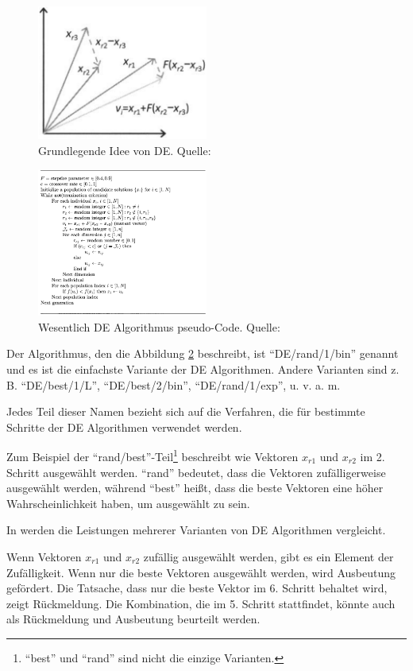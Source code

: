 \documentclass[twoside,twocolumn]{article}
\begin{document}
\begin{figure}[h]
\caption{Grundlegende Idee von DE. Quelle: \cite{wiley_evolutionary}}
\label{fig:de_beispiel}
\centering
\includegraphics[width=0.5\textwidth]{images/de_beispiel.png}
\end{figure}

\begin{figure}[h]
\caption{Wesentlich DE Algorithmus pseudo-Code. Quelle: \cite{wiley_evolutionary}}
\label{fig:de_pseudo}
\centering
\includegraphics[width=0.5\textwidth]{images/de_pseudo.png}
\end{figure}

Der Algorithmus, den die Abbildung \ref{fig:de_pseudo} beschreibt, ist \enquote{DE/rand/1/bin} genannt und es ist die einfachste Variante der DE Algorithmen. Andere Varianten sind z. B. \enquote{DE/best/1/L}, \enquote{DE/best/2/bin}, \enquote{DE/rand/1/exp},  u. v. a. m.\par
Jedes Teil dieser Namen bezieht sich auf die Verfahren, die für bestimmte Schritte der DE Algorithmen verwendet werden.\par
Zum Beispiel der \enquote{rand/best}-Teil\footnote{\enquote{best} und \enquote{rand} sind nicht die einzige Varianten.} beschreibt wie Vektoren $x_{r1}$ und $x_{r2}$ im 2. Schritt ausgewählt werden. \enquote{rand} bedeutet, dass die Vektoren zufälligerweise ausgewählt werden, während \enquote{best} heißt, dass die beste Vektoren eine höher Wahrscheinlichkeit haben, um ausgewählt zu sein.\par
In \cite{love_u_mex} werden die Leistungen mehrerer Varianten von DE Algorithmen vergleicht.\par
Wenn Vektoren $x_{r1}$ und $x_{r2}$ zufällig ausgewählt werden, gibt es ein Element der Zufälligkeit. Wenn nur die beste Vektoren ausgewählt werden, wird Ausbeutung gefördert. Die Tatsache, dass nur die beste Vektor im 6. Schritt behaltet wird, zeigt Rückmeldung. Die Kombination, die im 5. Schritt stattfindet, könnte auch als Rückmeldung und Ausbeutung beurteilt werden.
\end{document}
